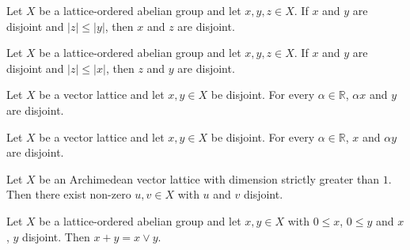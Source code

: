 \begin{lemma}
\label{lem:isVLDisjoint-mono-right}
\leanok
{}
Let $X$ be a lattice-ordered abelian group and let $x, y, z \in X$. If
$x$ and $y$ are disjoint and $\lvert z \rvert \le \lvert y \rvert$, then
$x$ and $z$ are disjoint.
\end{lemma}

\begin{lemma}
\label{lem:isVLDisjoint-mono-left}
\leanok
{}
Let $X$ be a lattice-ordered abelian group and let $x, y, z \in X$. If
$x$ and $y$ are disjoint and $\lvert z \rvert \le \lvert x \rvert$, then
$z$ and $y$ are disjoint.
\end{lemma}

\begin{lemma}
\label{lem:isVLDisjoint-smul-left}
\leanok
{}
Let $X$ be a vector lattice and let $x, y \in X$ be disjoint. For every
$\alpha \in \mathbb{R}$, $\alpha x$ and $y$ are disjoint.
\end{lemma}

\begin{lemma}
\label{lem:isVLDisjoint-smul-right}
\leanok
{}
Let $X$ be a vector lattice and let $x, y \in X$ be disjoint. For every
$\alpha \in \mathbb{R}$, $x$ and $\alpha y$ are disjoint.
\end{lemma}

\begin{theorem}
\label{thm:exists-pair-ne-zero-isVLDisjoint}
\leanok
{}
Let $X$ be an Archimedean vector lattice with dimension strictly greater
than $1$. Then there exist non-zero $u, v \in X$ with $u$ and $v$
disjoint.
\end{theorem}

\begin{lemma}
\label{lem:add-eq-sup-of-isVLDisjoint-of-nonneg}
\leanok
{}
Let $X$ be a lattice-ordered abelian group and let $x, y \in X$ with
$0 \le x$, $0 \le y$ and $x$, $y$ disjoint. Then $x + y = x \vee y$.
\end{lemma}

